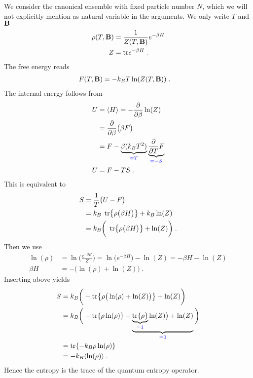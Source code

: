 We consider the canonical ensemble with fixed particle number $N$, which we will not explicitly mention as natural variable in the arguments. We only write $T$ and $\mathbf B$
%
\begin{align*}
\rho(T,\mathbf B) &= \frac{1}{Z(T,\mathbf B)} e^{-\beta H}\\
Z &= \text{tr} e^{-\beta H} \;.
\end{align*}
%
The free energy reads
%
\begin{align}\label{eq:}
F(T,\mathbf B) &= -k_{B} T \ln(Z(T,\mathbf B))\;.
\end{align}
%
The internal energy follows from
%
\begin{align*}
U &=\langle H \rangle = -\frac{\partial }{\partial \beta} \ln(Z)\\
&= \frac{\partial }{\partial \beta} \big(\beta F\big) \\
&= F  - \underbrace{
\beta (k_{B}T^{2})
}_{\color{blue} = T}\underbrace{
\frac{\partial }{\partial T}  F 
}_{\color{blue} = -S}\\
U &= F-TS\;.
\end{align*}
%
This is equivalent to
%
\begin{align*}
 S &=\frac{1}{T}\big( U- F \big)\\
  &=k_{B} \;\tr{ \rho \big(\beta H\big)}  + k_{B} \ln(Z)\\
    &=k_{B} \bigg(\;\tr{ \rho \big(\beta H\big)}  +  \ln(Z)\bigg)\;.
\end{align*}
%
Then we use 
%
\begin{align*}
\ln(\rho) 
&= \ln\bigg( \frac{e^{-\beta H}}{Z} \bigg) 
= \ln\bigg( e^{-\beta H}\bigg) -\ln(Z)
= -\beta H -\ln(Z)\\
\beta H &= -\bigg( \ln(\rho) +\ln(Z) \bigg)\;.
\end{align*}
%
Inserting above yields
%
\begin{align*}
S 
&= k_{B}\bigg( -\tr{\rho\big( \ln(\rho) + \ln(Z) \big)} + \ln(Z) \bigg)\\
&= k_{B}\bigg( -\tr{\rho\ln(\rho)} -   \underbrace{
\underbrace{
\tr{\rho}
}_{\color{blue} = 1}\ln(Z) \big) + \ln(Z)
}_{\color{blue} = 0} \bigg)\\
&= \tr{ -k_{B} \rho\ln(\rho)} \\
&=-k_{B} \langle \ln(\rho)\rangle\;.
\end{align*}
%
Hence the entropy is the trace of the quantum entropy operator.






